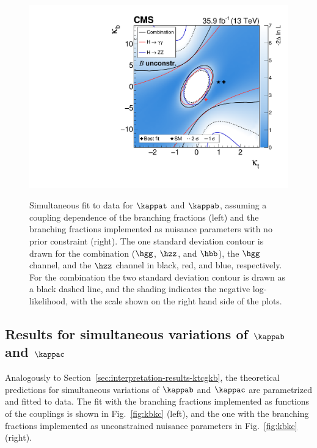 \begin{figure}[hbtp]
\begin{center}
{        \includegraphics[width=0.49\linewidth]{img/interpretation/multicont_ktkb_floatingBRs.pdf}        
        }
    \caption{
        Simultaneous fit to data for $\kappat$ and $\kappab$, assuming a coupling dependence of the branching fractions (left) and the branching fractions implemented as nuisance parameters with no prior constraint (right).
        The one standard deviation contour is drawn for the combination ($\hgg$, $\hzz$, and $\hbb$), the $\hgg$ channel, and the $\hzz$ channel in black, red, and blue, respectively.
        For the combination the two standard deviation contour is drawn as a black dashed line, and the shading indicates the negative log-likelihood, with the scale shown on the right hand side of the plots.
        }
    \label{fig:ktkb}
  \end{center}
\end{figure}



\subsection{Results for simultaneous variations of \texorpdfstring{$\kappab$}{kb} and \texorpdfstring{$\kappac$}{kc}}
\label{sec:interpretation-results-kbkc}


Analogously to Section~\ref{sec:interpretation-results-ktcgkb}, the theoretical predictions for simultaneous variations of $\kappab$ and $\kappac$ are parametrized and fitted to data.
% 
The fit with the branching fractions implemented as functions of the couplings is shown in Fig.~\ref{fig:kbkc} (left), and the one with the branching fractions implemented as unconstrained nuisance parameters in Fig.~\ref{fig:kbkc} (right).


